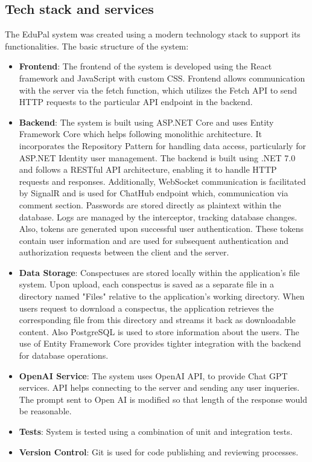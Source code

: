 \documentclass[
    english, %
]{VUMIFPSkursinis}
\begin{document}
\subsection{Tech stack and services}

The EduPal system was created using a modern technology stack to support its functionalities. The basic structure of the system:

\begin{itemize}
    \item \textbf{Frontend}: The frontend of the system is developed using the React framework and JavaScript with custom CSS. Frontend allows communication with the server via the fetch function, which utilizes the Fetch API to send HTTP requests to the particular API endpoint in the backend.
    \item \textbf{Backend}: The system is built using ASP.NET Core and uses Entity Framework Core which helps following monolithic architecture. It incorporates the Repository Pattern for handling data access, particularly for ASP.NET Identity user management. The backend is built using .NET 7.0 and follows a RESTful API architecture, enabling it to handle HTTP requests and responses. Additionally, WebSocket communication is facilitated by SignalR and is used for ChatHub endpoint which, communication via comment section. Passwords are stored directly as plaintext within the database. Logs are managed by the interceptor, tracking database changes. Also, tokens are generated upon successful user authentication. These tokens contain user information and are used for subsequent authentication and authorization requests between the client and the server.
    \item\textbf{Data Storage}: Conspectuses are stored locally within the application's file system. Upon upload, each conspectus is saved as a separate file in a directory named "Files" relative to the application's working directory. When users request to download a conspectus, the application retrieves the corresponding file from this directory and streams it back as downloadable content. Also PostgreSQL is used to store information about the users. The use of Entity Framework Core provides tighter integration with the backend for database operations.
    \item \textbf{OpenAI Service}: The system uses OpenAI API, to provide Chat GPT services. API helps connecting to the server and sending any user inqueries. The prompt sent to Open AI is modified so that length of the response would be reasonable.
    \item \textbf{Tests}: System is tested using a combination of unit and integration tests.
    \item \textbf{Version Control}: Git is used for code publishing and reviewing processes.
\end{itemize}
\end{document}
